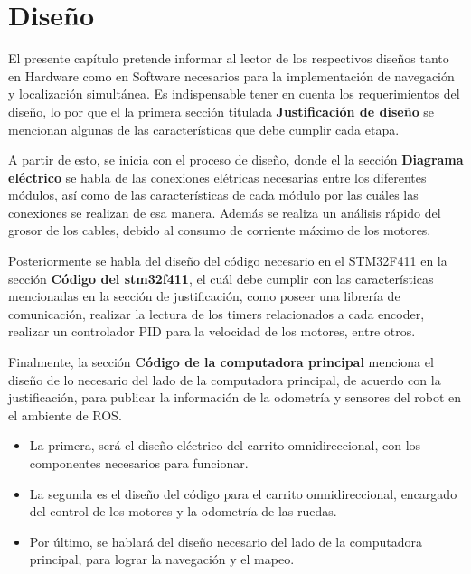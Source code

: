   \chapter{Diseño}
\label{C:diseño}

El presente capítulo pretende informar al lector de los respectivos diseños tanto en Hardware como en Software necesarios para la implementación de navegación y localización simultánea. Es indispensable tener en cuenta los requerimientos del diseño, lo por que el la primera sección titulada \textbf{Justificación de diseño} se mencionan algunas de las características que debe cumplir cada etapa.

A partir de esto, se inicia con el proceso de diseño, donde el la sección \textbf{Diagrama eléctrico} se habla de las conexiones elétricas necesarias entre los diferentes módulos, así como de las características de cada módulo por las cuáles las conexiones se realizan de esa manera. Además se realiza un análisis rápido del grosor de los cables, debido al consumo de corriente máximo de los motores.

Posteriormente se habla del diseño del código necesario en el STM32F411 en la sección \textbf{Código del stm32f411}, el cuál debe cumplir con las características mencionadas en la sección de justificación, como poseer una librería de comunicación, realizar la lectura de los timers relacionados a cada encoder, realizar un controlador PID para la velocidad de los motores, entre otros.

Finalmente, la sección \textbf{Código de la computadora principal} menciona el diseño de lo necesario del lado de la computadora principal, de acuerdo con la justificación, para publicar la información de la odometría y sensores del robot en el ambiente de ROS.

\begin{itemize}
\item La primera, será el diseño eléctrico del carrito omnidireccional, con los componentes necesarios para funcionar.
\item La segunda es el diseño del código para el carrito omnidireccional, encargado del control de los motores y la odometría de las ruedas.
\item Por último, se hablará del diseño necesario del lado de la computadora principal, para lograr la navegación y el mapeo.
\end{itemize}

\newpage


